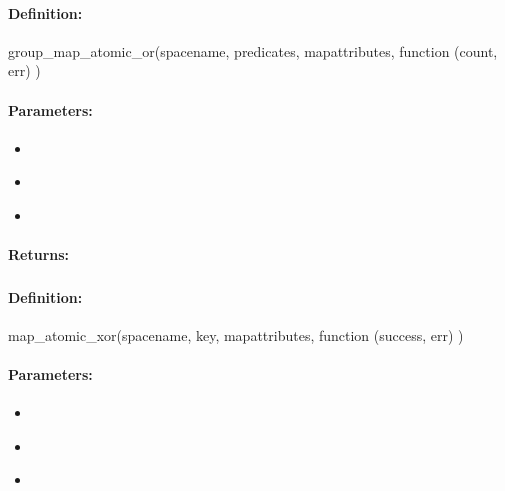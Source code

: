 \paragraph{Definition:}
\begin{javascriptcode}
group_map_atomic_or(spacename, predicates, mapattributes, function (count, err) {})
\end{javascriptcode}
\paragraph{Parameters:}
\begin{itemize}[noitemsep]
\item {}\\

\item {}\\

\item {}\\

\end{itemize}

\paragraph{Returns:}


\pagebreak
\subsubsection{}
\label{api:nodejs:map_atomic_xor}


\paragraph{Definition:}
\begin{javascriptcode}
map_atomic_xor(spacename, key, mapattributes, function (success, err) {})
\end{javascriptcode}
\paragraph{Parameters:}
\begin{itemize}[noitemsep]
\item {}\\

\item {}\\

\item {}\\

\end{itemize}

